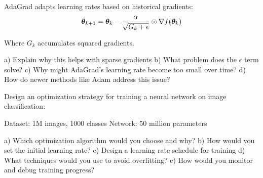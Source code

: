 \documentclass{article}
\newcounter{exercise}
\begin{document}
\begin{tcolorbox}[colback=gray!5!white,colframe=gray!75!black,title=Problem \stepcounter{exercise}: Adaptive Learning Rates]

AdaGrad adapts learning rates based on historical gradients:
$$\boldsymbol{\theta}_{k+1} = \boldsymbol{\theta}_k - \frac{\alpha}{\sqrt{G_k + \epsilon}} \odot \nabla f(\boldsymbol{\theta}_k)$$

Where $G_k$ accumulates squared gradients.

a) Explain why this helps with sparse gradients
b) What problem does the $\epsilon$ term solve?
c) Why might AdaGrad's learning rate become too small over time?
d) How do newer methods like Adam address this issue?
\end{tcolorbox}

\begin{tcolorbox}[colback=gray!5!white,colframe=gray!75!black,title=Problem \stepcounter{exercise}: Real-world Optimization Strategy]

Design an optimization strategy for training a neural network on image classification:

Dataset: 1M images, 1000 classes
Network: 50 million parameters

a) Which optimization algorithm would you choose and why?
b) How would you set the initial learning rate?
c) Design a learning rate schedule for training
d) What techniques would you use to avoid overfitting?
e) How would you monitor and debug training progress?
\end{tcolorbox}
\end{document}
